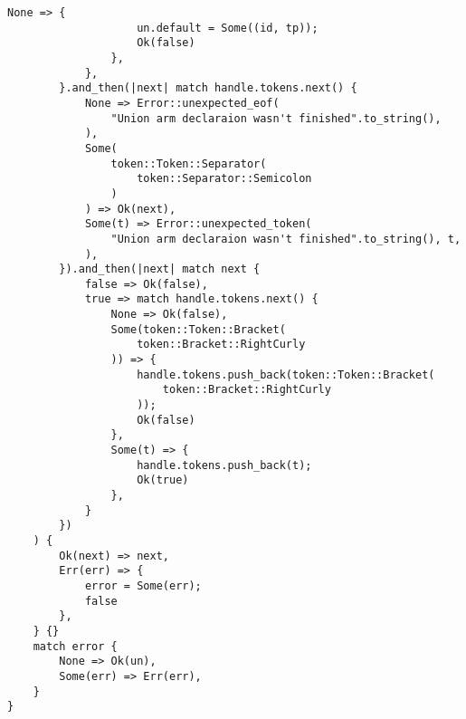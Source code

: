 \begin{lstlisting}[caption={Разбор объединения (часть 5)}, label={lst:rust_parser_union5}]
                None => {
                    un.default = Some((id, tp));
                    Ok(false)
                },
            },
        }.and_then(|next| match handle.tokens.next() {
            None => Error::unexpected_eof(
                "Union arm declaraion wasn't finished".to_string(),
            ),
            Some(
                token::Token::Separator(
                    token::Separator::Semicolon
                )
            ) => Ok(next),
            Some(t) => Error::unexpected_token(
                "Union arm declaraion wasn't finished".to_string(), t,
            ),
        }).and_then(|next| match next {
            false => Ok(false),
            true => match handle.tokens.next() {
                None => Ok(false),
                Some(token::Token::Bracket(
                    token::Bracket::RightCurly
                )) => {
                    handle.tokens.push_back(token::Token::Bracket(
                        token::Bracket::RightCurly
                    ));
                    Ok(false)
                },
                Some(t) => {
                    handle.tokens.push_back(t);
                    Ok(true)
                },
            }
        })
    ) {
        Ok(next) => next,
        Err(err) => {
            error = Some(err);
            false
        },
    } {}
    match error {
        None => Ok(un),
        Some(err) => Err(err),
    }
}
\end{lstlisting}

